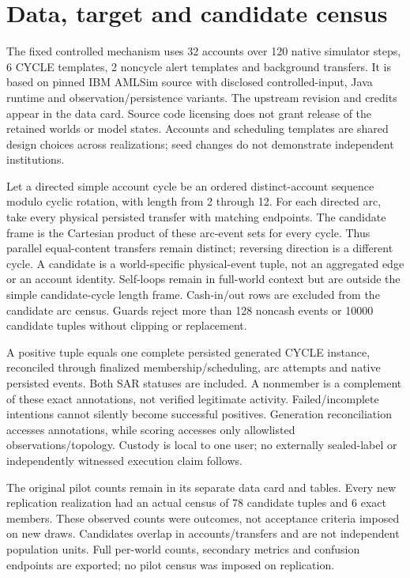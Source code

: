 \documentclass{article}
\begin{document}
\section{Data, target and candidate census}

The fixed controlled mechanism uses 32 accounts over 120 native simulator steps, 6 CYCLE templates, 2 noncycle alert templates and background transfers. It is based on pinned IBM AMLSim source with disclosed controlled-input, Java runtime and observation/persistence variants. The upstream revision and credits appear in the data card. Source code licensing does not grant release of the retained worlds or model states. Accounts and scheduling templates are shared design choices across realizations; seed changes do not demonstrate independent institutions.

Let a directed simple account cycle be an ordered distinct-account sequence modulo cyclic rotation, with length from 2 through 12. For each directed arc, take every physical persisted transfer with matching endpoints. The candidate frame is the Cartesian product of these arc-event sets for every cycle. Thus parallel equal-content transfers remain distinct; reversing direction is a different cycle. A candidate is a world-specific physical-event tuple, not an aggregated edge or an account identity. Self-loops remain in full-world context but are outside the simple candidate-cycle length frame. Cash-in/out rows are excluded from the candidate arc census. Guards reject more than 128 noncash events or 10000 candidate tuples without clipping or replacement.

A positive tuple equals one complete persisted generated CYCLE instance, reconciled through finalized membership/scheduling, arc attempts and native persisted events. Both SAR statuses are included. A nonmember is a complement of these exact annotations, not verified legitimate activity. Failed/incomplete intentions cannot silently become successful positives. Generation reconciliation accesses annotations, while scoring accesses only allowlisted observations/topology. Custody is local to one user; no externally sealed-label or independently witnessed execution claim follows.

The original pilot counts remain in its separate data card and tables. Every new replication realization had an actual census of 78 candidate tuples and 6 exact members. These observed counts were outcomes, not acceptance criteria imposed on new draws. Candidates overlap in accounts/transfers and are not independent population units. Full per-world counts, secondary metrics and confusion endpoints are exported; no pilot census was imposed on replication.
\end{document}
